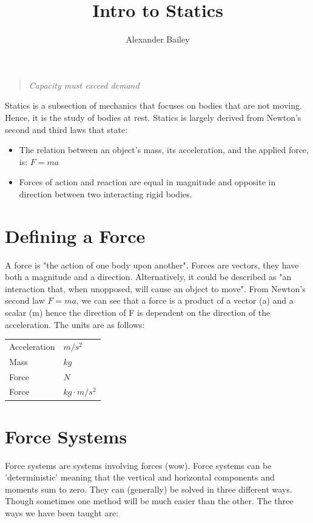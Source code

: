 \documentclass[a4paper, 12pt]{article}
\begin{document}
\title{Intro to Statics}
\author{Alexander Bailey}
\maketitle

\begin{quote}
\textit{Capacity must exceed demand}
\end{quote}

Statics is a subsection of mechanics that focuses on bodies that are not moving.
Hence, it is the study of bodies at rest.
Statics is largely derived from Newton's second and third laws that state:

\begin{itemize}
    \item The relation between an object's mass, its acceleration, and the applied force, is: $F=ma$
    \item Forces of action and reaction are equal in magnitude and opposite in direction between two interacting rigid bodies.
\end{itemize}

\section{Defining a Force}
A force is "the action of one body upon another". Forces are vectors, they have both a magnitude and a direction.
Alternatively, it could be described as "an interaction that, when unopposed, will cause an object to move". 
From Newton's second law $F=ma$, we can see that a force is a product of a vector (a) and a scalar (m) hence
the direction of F is dependent on the direction of the acceleration. The units are as follows:  
\newline
\vspace*{2cm}
\begin{tabular}{l|l}
    Acceleration & $m/s^2$ \\
    Mass & $kg$ \\
    Force & $N$ \\
    Force & $kg\cdot m/s^2$ \\
\end{tabular}

\section{Force Systems}
Force systems are systems involving forces (wow). Force systems can be 'deterministic' meaning that the vertical and horizontal components and moments sum to zero.
They can (generally) be solved in three different ways.
Though sometimes one method will be much easier than the other. The three ways we have been taught are:
\end{document}
